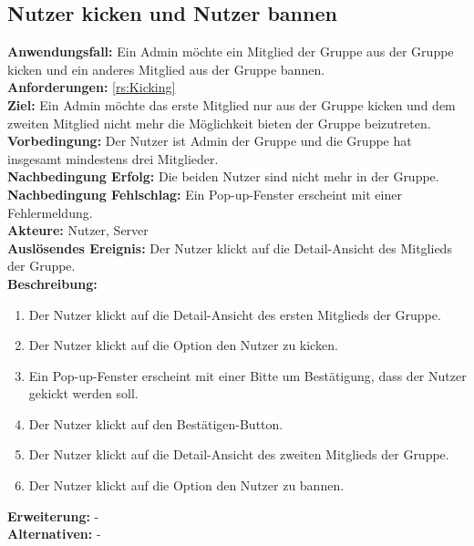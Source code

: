 \documentclass[parskip=full]{scrartcl}
\begin{document}
\subsection{Nutzer kicken und Nutzer bannen}
\textbf{Anwendungsfall:} Ein Admin möchte ein Mitglied der Gruppe aus der Gruppe kicken und ein anderes Mitglied aus der Gruppe bannen.\\
\textbf{Anforderungen:} \ref{rs:Kicking}\\
\textbf{Ziel:} Ein Admin möchte das erste Mitglied nur aus der Gruppe kicken und dem zweiten Mitglied nicht mehr die Möglichkeit bieten der Gruppe beizutreten.\\
\textbf{Vorbedingung:} Der Nutzer ist Admin der Gruppe und die Gruppe hat insgesamt mindestens drei Mitglieder.\\
\textbf{Nachbedingung Erfolg:} Die beiden Nutzer sind nicht mehr in der Gruppe.\\
\textbf{Nachbedingung Fehlschlag:} Ein Pop-up-Fenster erscheint mit einer Fehlermeldung.\\
\textbf{Akteure:} Nutzer, Server \\
\textbf{Auslösendes Ereignis:} Der Nutzer klickt auf die Detail-Ansicht des Mitglieds der Gruppe.\\
\textbf{Beschreibung:}
\begin{enumerate}
    \item Der Nutzer klickt auf die Detail-Ansicht des ersten Mitglieds der Gruppe.
    \item Der Nutzer klickt auf die Option den Nutzer zu kicken.
    \item Ein Pop-up-Fenster erscheint mit einer Bitte um Bestätigung, dass der Nutzer gekickt werden soll.
    \item Der Nutzer klickt auf den Bestätigen-Button.
    \item Der Nutzer klickt auf die Detail-Ansicht des zweiten Mitglieds der Gruppe.
    \item Der Nutzer klickt auf die Option den Nutzer zu bannen.
\end{enumerate}
\textbf{Erweiterung:} -\\
\textbf{Alternativen:} -
\newpage
\end{document}
